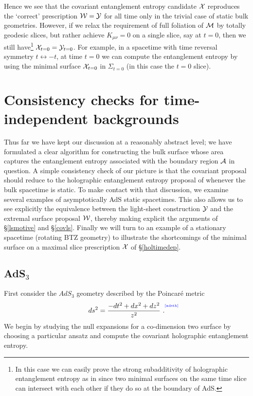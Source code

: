 \documentclass[12pt]{article}
\newcommand{\be}{\begin{equation}}
\newcommand{\ee}{\end{equation}}
\def\sec#1{\S \;\ref{#1}}
\def\CA{{\cal A}}
\def\CW{{\cal W}}
\def\CX{{\cal X}}
\def\CY{{\cal Y}}
\def\f#1#2{{\frac{#1}{#2}}}
\def\f#1#2{{\frac{#1}{#2}}}
\def\Label#1{\label{#1}%
{ \color{blue}{\smash{\hbox to0pt{\raise2ex\hbox{\tiny[#1]}\hss}}}}}
\def\bulk{{\cal M}}
\def\Gms{\CW}
\def\Lms{\CY}
\def\Xms{\CX}
\def\rA{\CA}
\def\f {\frac}
\begin{document}
Hence we see that the covariant entanglement entropy candidate $\Xms$ reproduces the `correct' prescription $\Gms = \Lms$ for all time only in the trivial case of static bulk geometries.
However, if we relax the requirement of full foliation of $\bulk$ by totally geodesic slices,
 but rather achieve $K_{\mu\nu}=0$ on a single slice, say at $t=0$, then we still have\footnote{
In this case we can easily prove the strong subadditivity of
holographic entanglement entropy \cite{Hirata:2006jx} as in
\cite{Matt} since two minimal surfaces on the same time slice can
intersect with each other if they do so at the boundary of
AdS.} $\Xms_{t=0}=\Lms_{t=0}$. For
example, in a spacetime with time reversal symmetry
$t\leftrightarrow -t$, at time $t=0$ we can compute the entanglement
entropy by using the minimal surface $\Xms_{t=0}$ in $\Sigma_{t=0}$
(in this case the $t=0$ slice).



\section{Consistency checks for time-independent backgrounds}
\label{examples}


Thus far we have kept our discussion at a reasonably abstract level;
we have formulated a clear algorithm for constructing the bulk
surface whose area captures the entanglement entropy associated with
the boundary region $\rA$ in question. A simple consistency check of
our picture is that the covariant proposal should reduce to the
holographic entanglement entropy proposal of \cite{Ryu:2006bv,
Ryu:2006ef} whenever the bulk spacetime is static. To make contact
with that discussion, we examine several examples of asymptotically
AdS static spacetimes. This also allows us to see explicitly the
equivalence between the light-sheet construction $\Lms$ and the
extremal surface proposal $\Gms$, thereby making explicit the
arguments of \sec{lsmotive} and \sec{covls}. Finally we will turn to
an example of a stationary spacetime (rotating BTZ geometry) to
illustrate the shortcomings of the minimal surface on a maximal
slice prescription  $\Xms$ of \sec{holtimedep}.

\subsection{AdS$_{3}$}
\label{3adsex}
First consider the $AdS_3$ geometry described by the Poincar\'e metric
%
\be
ds^2=\f{-dt^2+dx^2+dz^2}{z^2} \ . \Label{adsth} \ee
%
We begin by studying the null expansions  for a co-dimension two surface by choosing a particular ansatz and compute the covariant holographic entanglement entropy.
\end{document}
